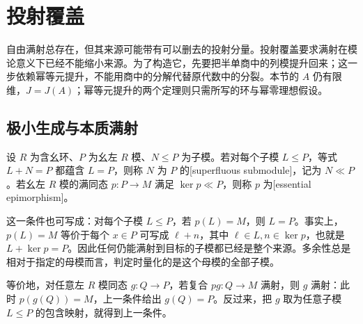 
\section{投射覆盖}
\label{b2:sec:1503}

自由满射总存在，但其来源可能带有可以删去的投射分量。投射覆盖要求满射在模论意义下已经不能缩小来源。为了构造它，先要把半单商中的列模提升回来；这一步依赖幂等元提升，不能用商中的分解代替原代数中的分裂。本节的 \(A\) 仍有限维，\(J=J(A)\)；幂等元提升的两个定理则只需所写的环与幂零理想假设。

%
%

\subsection{极小生成与本质满射}
\label{b2:subsec:1503:01}

\begin{definition}\label{b2:def:superfluous-submodule}
	设 \(R\) 为含幺环、\(P\) 为幺左 \(R\) 模、\(N\le P\) 为子模。若对每个子模 \(L\le P\)，等式 \(L+N=P\) 都蕴含 \(L=P\)，则称 \(N\) 为 \(P\) 的[superfluous submodule]，记为 \(N\ll P\)。若幺左 \(R\) 模的满同态 \(p:P\to M\) 满足 \(\ker p\ll P\)，则称 \(p\) 为[essential epimorphism]。
\end{definition}

这一条件也可写成：对每个子模 \(L\le P\)，若 \(p(L)=M\)，则 \(L=P\)。事实上，\(p(L)=M\) 等价于每个 \(x\in P\) 可写成 \(\ell+n\)，其中 \(\ell\in L,n\in\ker p\)，也就是 \(L+\ker p=P\)。因此任何仍能满射到目标的子模都已经是整个来源。多余性总是相对于指定的母模而言，判定时量化的是这个母模的全部子模。

\ProseParagraphBreak

等价地，对任意左 \(R\) 模同态 \(g:Q\to P\)，若复合 \(pg:Q\to M\) 满射，则 \(g\) 满射：此时 \(p(g(Q))=M\)，上一条件给出 \(g(Q)=P\)。反过来，把 \(g\) 取为任意子模 \(L\le P\) 的包含映射，就得到上一条件。

